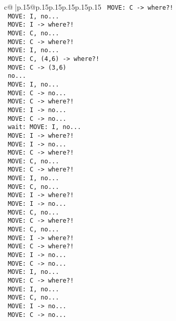 \documentclass{article}
\begin{document}
{\begin{supertabular}{c@{$\;$}|p{.15\linewidth}@{}p{.15\linewidth}p{.15\linewidth}p{.15\linewidth}p{.15\linewidth}p{.15\linewidth}}
{{{\texttt{ MOVE: C {-}> where?!} \\
\texttt{ MOVE: I, no...} \\
\texttt{ MOVE: I {-}> where?!} \\
\texttt{ MOVE: C, no...} \\
\texttt{ MOVE: C {-}> where?!} \\
\texttt{ MOVE: I, no...} \\
\texttt{ MOVE: C, (4,6) {-}> where?!} \\
\texttt{ MOVE: C {-}> (3,6) } \\
\texttt{ no...} \\
\texttt{ MOVE: I, no...} \\
\texttt{ MOVE: C {-}> no...} \\
\texttt{ MOVE: C {-}> where?!} \\
\texttt{ MOVE: I {-}> no...} \\
\texttt{ MOVE: C {-}> no...} \\
\texttt{ wait: MOVE: I, no...} \\
\texttt{ MOVE: I {-}> where?!} \\
\texttt{ MOVE: I {-}> no...} \\
\texttt{ MOVE: C {-}> where?!} \\
\texttt{ MOVE: C, no...} \\
\texttt{ MOVE: C {-}> where?!} \\
\texttt{ MOVE: I, no...} \\
\texttt{ MOVE: C, no...} \\
\texttt{ MOVE: I {-}> where?!} \\
\texttt{ MOVE: I {-}> no...} \\
\texttt{ MOVE: C, no...} \\
\texttt{ MOVE: C {-}> where?!} \\
\texttt{ MOVE: C, no...} \\
\texttt{ MOVE: I {-}> where?!} \\
\texttt{ MOVE: C {-}> where?!} \\
\texttt{ MOVE: I {-}> no...} \\
\texttt{ MOVE: C {-}> no...} \\
\texttt{ MOVE: I, no...} \\
\texttt{ MOVE: C {-}> where?!} \\
\texttt{ MOVE: I, no...} \\
\texttt{ MOVE: C, no...} \\
\texttt{ MOVE: I {-}> no...} \\
\texttt{ MOVE: C {-}> no...} \\
}}}
\end{supertabular}}
\end{document}

